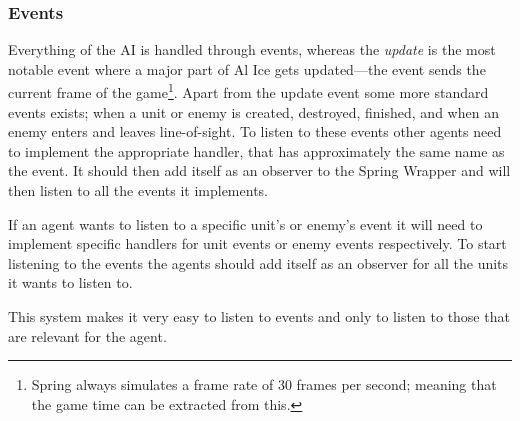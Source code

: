 \subsubsection{Events}
Everything of the AI is handled through events, whereas the \emph{update} is the most
notable event where a major part of Al Ice gets updated---the event sends the current frame of the
game\footnote{Spring always simulates a frame rate of 30 frames per second; meaning that the game
time can be extracted from this.}. Apart from the update event some more standard events exists;
when a unit or enemy is created, destroyed, finished, and when an enemy enters and leaves
line-of-sight. To listen to these events other agents need to implement the appropriate handler,
that has approximately the same name as the event. It should then add itself as an observer to
the Spring Wrapper and will then listen to all the events it implements.

If an agent wants to listen to a specific unit's or enemy's event it will need to implement
specific handlers for unit events or enemy events respectively. To start listening to the events the
agents should add itself as an observer for all the units it wants to listen to.

This system makes it very easy to listen to events and only to listen to those that are relevant for
the agent.

